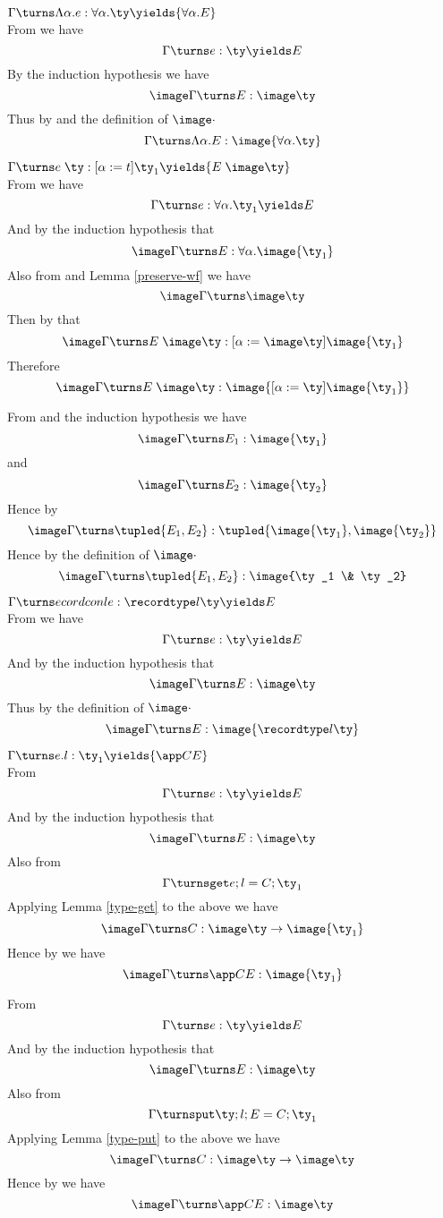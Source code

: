  $ \Gamma \turns \Lambda \alpha. e : \forall \alpha. \ty \yields {\forall \alpha. E} $ \\

From  we have
  $$ \Gamma \turns e : \ty \yields E $$
By the induction hypothesis we have
  $$ \image \Gamma \turns E : \image \ty $$
Thus by  and the definition of $ \image \cdot $
  $$ \Gamma \turns \Lambda \alpha. E : \image {\forall \alpha. \ty} $$


 $ \Gamma \turns e \; \ty  : [\alpha := t] \ty_1 \yields {E \; \image \ty} $ \\

From  we have
  $$ \Gamma \turns e : \forall \alpha. \ty_1 \yields E $$
And by the induction hypothesis that
  $$ \image \Gamma \turns E : \forall \alpha. \image {\ty_1} $$
Also from  and Lemma \ref{preserve-wf} we have
  $$ \image \Gamma \turns \image \ty $$
Then by  that
  $$ \image \Gamma \turns E \; \image \ty : [\alpha := \image \ty ] \image {\ty_1} $$
Therefore
  $$ \image \Gamma \turns E \; \image \ty : \image {[\alpha := \ty ] \image {\ty_1}} $$


From  and the induction hypothesis we have
  $$ \image \Gamma \turns E_1 : \image {\ty_1} $$
and
  $$ \image \Gamma \turns E_2 : \image {\ty_2} $$
Hence by 
  $$ \image \Gamma \turns \tupled {E_1, E_2} : \tupled {\image {\ty_1}, \image {\ty_2}} $$
Hence by the definition of $ \image \cdot $
  $$ \image \Gamma \turns \tupled {E_1, E_2} : \image {\ty_1 \& \ty_2} $$

 $ \Gamma \turns 
ecordcon l e : \recordtype l \ty \yields E $ \\

From  we have
  $$ \Gamma \turns e : \ty \yields E $$
And by the induction hypothesis that
  $$ \image \Gamma \turns E : \image \ty $$
Thus by the definition of $ \image \cdot $
  $$ \image \Gamma \turns E : \image {\recordtype l \ty} $$

 $ \Gamma \turns e.l : \ty_1 \yields {\app C E} $ \\

From 
  $$ \Gamma \turns e : \ty \yields E $$
And by the induction hypothesis that
  $$ \image \Gamma \turns E : \image \ty $$
Also from 
  $$ \Gamma \turnsget e ; l = C ; \ty_1 $$
Applying Lemma \ref{type-get} to the above we have
  $$ \image \Gamma \turns C : \image \ty \to \image {\ty_1}  $$
Hence by  we have
  $$ \image \Gamma \turns \app C E : \image {\ty_1} $$

From 
  $$ \Gamma \turns e : \ty \yields E $$
And by the induction hypothesis that
  $$ \image \Gamma \turns E : \image \ty $$
Also from 
  $$ \Gamma \turnsput \ty ; l; E = C ; \ty_1 $$
Applying Lemma \ref{type-put} to the above we have
  $$ \image \Gamma \turns C : \image \ty \to \image \ty  $$
Hence by  we have
  $$ \image \Gamma \turns \app C E : \image \ty $$
